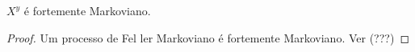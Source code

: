 \begin{corolario}
  \label{cor:proc_fort_markov}
  $X^y$ é fortemente Markoviano.
\end{corolario}
\begin{proof}
  Um processo de Fel ler Markoviano é fortemente Markoviano. Ver (???)
\end{proof}



